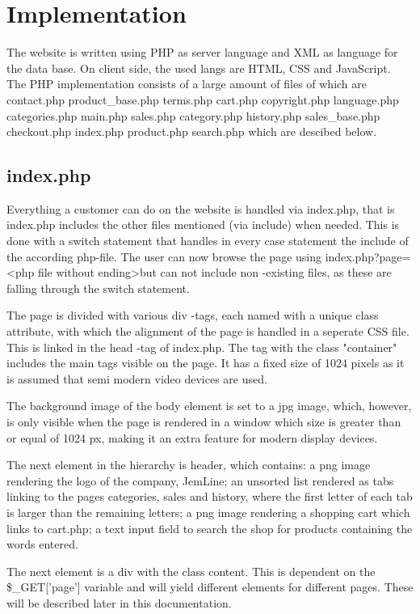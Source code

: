 \documentclass{scrartcl}
\begin{document}
\section{Implementation}
The website is written using PHP as server language and XML as language for the data base. 
On client side, the used langs are HTML, CSS and JavaScript.
The PHP implementation consists of a large amount of files of which are  
contact.php     product\_base.php  terms.php
cart.php        copyright.php  	  language.php
categories.php  main.php          sales.php
category.php    history.php       sales\_base.php
checkout.php    index.php         product.php   search.php 
which are descibed below. 

\subsection{index.php}
Everything a customer can do on the website is handled via index.php, that is index.php 
includes the other files mentioned (via include) when needed. This is done with a switch statement that
handles in every case statement the include of the according php-file. The user can now browse the page
using index.php?page=\textless php file without ending\textgreater but can not include non -existing files, as these are
falling through the switch statement. 

The page is divided with various div -tags, each named with a unique class attribute, with which the 
alignment of the page is handled in a seperate CSS file. This is linked in the head -tag of index.php.
The tag with the class "container" includes the main tags visible on the page. It has a fixed size of
1024 pixels as it is assumed that semi modern video devices are used. 

The background image of the body element is set to a jpg image, which, however, is only visible when the page is rendered in a window
which size is greater than or equal of 1024 px, making it an extra feature for modern display devices. 

The next element in the hierarchy is header, which contains: a png image rendering the logo of the company, JemLine; an unsorted list rendered as tabs linking to the pages categories, sales and history, where the first letter of each tab is larger than the remaining letters; a png image rendering a shopping
cart which links to cart.php; a text input field to search the shop for products containing the words entered.

The next element is a div with the class content. This is dependent on the \$\_GET['page'] variable
and will yield different elements for different pages. These will be described later in this documentation.
\end{document}
